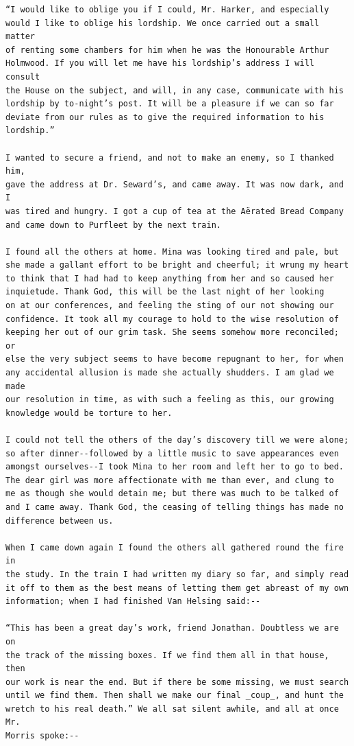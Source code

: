 \documentclass{article}
\begin{document}
\begin{verbatim}
“I would like to oblige you if I could, Mr. Harker, and especially
would I like to oblige his lordship. We once carried out a small matter
of renting some chambers for him when he was the Honourable Arthur
Holmwood. If you will let me have his lordship’s address I will consult
the House on the subject, and will, in any case, communicate with his
lordship by to-night’s post. It will be a pleasure if we can so far
deviate from our rules as to give the required information to his
lordship.”

I wanted to secure a friend, and not to make an enemy, so I thanked him,
gave the address at Dr. Seward’s, and came away. It was now dark, and I
was tired and hungry. I got a cup of tea at the Aërated Bread Company
and came down to Purfleet by the next train.

I found all the others at home. Mina was looking tired and pale, but
she made a gallant effort to be bright and cheerful; it wrung my heart
to think that I had had to keep anything from her and so caused her
inquietude. Thank God, this will be the last night of her looking
on at our conferences, and feeling the sting of our not showing our
confidence. It took all my courage to hold to the wise resolution of
keeping her out of our grim task. She seems somehow more reconciled; or
else the very subject seems to have become repugnant to her, for when
any accidental allusion is made she actually shudders. I am glad we made
our resolution in time, as with such a feeling as this, our growing
knowledge would be torture to her.

I could not tell the others of the day’s discovery till we were alone;
so after dinner--followed by a little music to save appearances even
amongst ourselves--I took Mina to her room and left her to go to bed.
The dear girl was more affectionate with me than ever, and clung to
me as though she would detain me; but there was much to be talked of
and I came away. Thank God, the ceasing of telling things has made no
difference between us.

When I came down again I found the others all gathered round the fire in
the study. In the train I had written my diary so far, and simply read
it off to them as the best means of letting them get abreast of my own
information; when I had finished Van Helsing said:--

“This has been a great day’s work, friend Jonathan. Doubtless we are on
the track of the missing boxes. If we find them all in that house, then
our work is near the end. But if there be some missing, we must search
until we find them. Then shall we make our final _coup_, and hunt the
wretch to his real death.” We all sat silent awhile, and all at once Mr.
Morris spoke:--


\end{verbatim}
\end{document}
